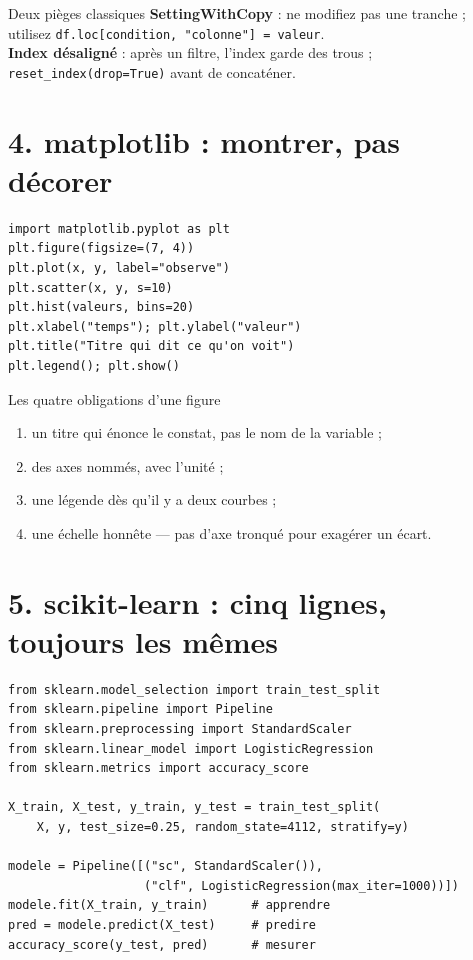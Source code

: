 \documentclass[9.5pt,a4paper]{article}
\begin{document}
\begin{piege}{Deux pièges classiques}
\textbf{SettingWithCopy} : ne modifiez pas une tranche ; utilisez
\texttt{df.loc[condition, "colonne"] = valeur}.\\
\textbf{Index désaligné} : après un filtre, l'index garde des trous ;
\texttt{reset\_index(drop=True)} avant de concaténer.
\end{piege}

\section*{\color{bleu}4. matplotlib : montrer, pas décorer}
\begin{lstlisting}
import matplotlib.pyplot as plt
plt.figure(figsize=(7, 4))
plt.plot(x, y, label="observe")
plt.scatter(x, y, s=10)
plt.hist(valeurs, bins=20)
plt.xlabel("temps"); plt.ylabel("valeur")
plt.title("Titre qui dit ce qu'on voit")
plt.legend(); plt.show()
\end{lstlisting}

\begin{astuce}{Les quatre obligations d'une figure}
\begin{enumerate}
  \item un titre qui énonce le constat, pas le nom de la variable ;
  \item des axes nommés, avec l'unité ;
  \item une légende dès qu'il y a deux courbes ;
  \item une échelle honnête --- pas d'axe tronqué pour exagérer un écart.
\end{enumerate}
\end{astuce}

\section*{\color{bleu}5. scikit-learn : cinq lignes, toujours les mêmes}
\begin{lstlisting}
from sklearn.model_selection import train_test_split
from sklearn.pipeline import Pipeline
from sklearn.preprocessing import StandardScaler
from sklearn.linear_model import LogisticRegression
from sklearn.metrics import accuracy_score

X_train, X_test, y_train, y_test = train_test_split(
    X, y, test_size=0.25, random_state=4112, stratify=y)

modele = Pipeline([("sc", StandardScaler()),
                   ("clf", LogisticRegression(max_iter=1000))])
modele.fit(X_train, y_train)      # apprendre
pred = modele.predict(X_test)     # predire
accuracy_score(y_test, pred)      # mesurer
\end{lstlisting}
\end{document}
